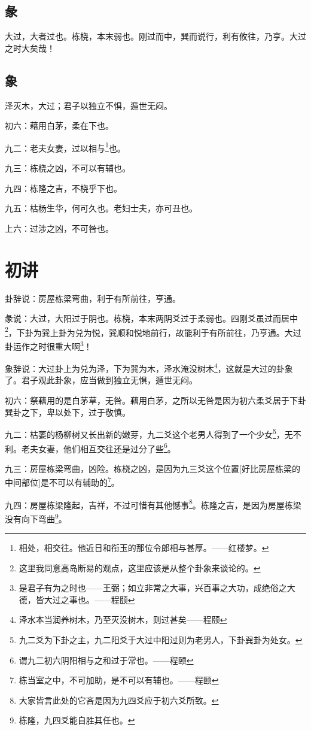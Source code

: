 \documentclass[12pt,oneside]{book}
\begin{document}
\subsection{彖}
大过，大者过也。栋桡，本末弱也。刚过而中，巽而说行，利有攸往，乃亨。大过之时大矣哉！

\subsection{象}
泽灭木，大过；君子以独立不惧，遁世无闷。

初六：藉用白茅，柔在下也。

九二：老夫女妻，过以相与\footnote{相处，相交往。他近日和衔玉的那位令郎相与甚厚。——红楼梦。}也。

九三：栋桡之凶，不可以有辅也。

九四：栋隆之吉，不桡乎下也。

九五：枯杨生华，何可久也。老妇士夫，亦可丑也。

上六：过涉之凶，不可咎也。

\section{初讲}
卦辞说：房屋栋梁弯曲，利于有所前往，亨通。

彖说：大过，大阳过于阴也。栋桡，本末两阴爻过于柔弱也。四刚爻虽过而居中\footnote{这里我同意高岛断易的观点，这里应该是从整个卦象来谈论的。}，下卦为巽上卦为兑为悦，巽顺和悦地前行，故能利于有所前往，乃亨通。大过卦运作之时很重大啊\footnote{是君子有为之时也——王弼；如立非常之大事，兴百事之大功，成绝俗之大德，皆大过之事也。——程颐}！

象辞说：大过卦上为兑为泽，下为巽为木，泽水淹没树木\footnote{泽水本当润养树木，乃至灭没树木，则过甚矣——程颐}，这就是大过的卦象了。君子观此卦象，应当做到独立无惧，遁世无闷。

初六：祭藉用的是白茅草，无咎。藉用白茅，之所以无咎是因为初六柔爻居于下卦巽卦之下，卑以处下，过于敬慎。

九二：枯萎的杨柳树又长出新的嫩芽，九二爻这个老男人得到了一个少女\footnote{九二爻为下卦之主，九二阳爻于大过中阳过则为老男人，下卦巽卦为处女。}，无不利。老夫女妻，他们相互交往还是过分了些\footnote{谓九二初六阴阳相与之和过于常也。——程颐}。

九三：房屋栋梁弯曲，凶险。栋桡之凶，是因为九三爻这个位置[好比房屋栋梁的中间部位]是不可以有辅助的\footnote{栋当室之中，不可加助，是不可以有辅也。——程颐}。

九四：房屋栋梁隆起，吉祥，不过可惜有其他憾事\footnote{大家皆言此处的它吝是因为九四爻应于初六爻所致。}。栋隆之吉，是因为房屋栋梁没有向下弯曲\footnote{栋隆，九四爻能自胜其任也。}。
\end{document}
